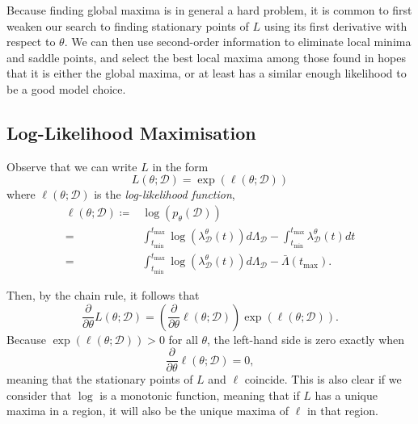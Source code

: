 \documentclass[honours,12pt]{unswthesis}
\numberwithin{equation}{section}
\begin{document}
Because finding global maxima is in general a hard problem, it is common to first weaken our search to finding stationary points of $L$ using its first derivative with respect to $\theta$. We can then use second-order information to eliminate local minima and saddle points, and select the best local maxima among those found in hopes that it is either the global maxima, or at least has a similar enough likelihood to be a good model choice.

\subsection{Log-Likelihood Maximisation}

Observe that we can write $L$ in the form
$$L(\theta;\mathcal{D}) = \exp(\ell(\theta;\mathcal{D}))$$
where $\ell(\theta;\mathcal{D})$ is the \textit{log-likelihood function},
\begin{equation*}
	\begin{align}
		\ell(\theta ; \mathcal{D})
		\coloneq &\log(p_\theta(\mathcal{D}))\\
		= & \int_{t_\mathrm{min}}^{t_\mathrm{max}}\log(\lambda_\mathcal{D}^\theta(t))d\Lambda_\mathcal{D}-\int_{t_\mathrm{min}}^{t_\mathrm{max}}\lambda_\mathcal{D}^\theta(t) dt \\
		= & \int_{t_\mathrm{min}}^{t_\mathrm{max}}\log(\lambda_\mathcal{D}^\theta(t))d\Lambda_\mathcal{D}-\bar\Lambda\left(t_\mathrm{max}\right).
	\end{align}
\end{equation*}

Then, by the chain rule, it follows that
$$\frac{\partial}{\partial\theta}L(\theta;\mathcal{D}) = \left(\frac{\partial}{\partial\theta}\ell(\theta;\mathcal{D})\right) \exp\left(\ell(\theta;\mathcal{D})\right).$$
Because $\exp\left(\ell(\theta;\mathcal{D})\right)>0$ for all $\theta$, the left-hand side is zero exactly when
$$\frac{\partial}{\partial\theta}\ell\left(\theta;\mathcal{D}\right)=0,$$
meaning that the stationary points of $L$ and $\ell$ coincide. This is also clear if we consider that $\log$ is a monotonic function, meaning that if $L$ has a unique maxima in a region, it will also be the unique maxima of $\ell$ in that region.
\end{document}
